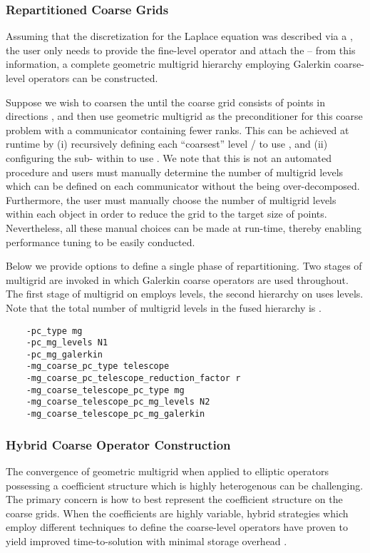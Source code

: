 \documentclass[]{siamart0216}
\begin{document}
\subsubsection{Repartitioned Coarse Grids}
	Assuming that the discretization for the Laplace equation was described via a , 
	the user only needs to provide the fine-level operator and attach the  -- 
	from this information, a complete geometric multigrid hierarchy employing Galerkin 
	coarse-level operators can be constructed. 
	
	Suppose we wish to coarsen the  until the coarse grid consists of 
	 points in directions , and then use geometric 
	multigrid as the preconditioner for this coarse problem with a communicator containing fewer ranks.
	This can be achieved at runtime by (i) recursively defining each ``coarsest'' 
	level / to use , and (ii) configuring the sub- within  to use .
	We note that this is not an automated procedure and users must manually 
	determine the number of multigrid levels which can be defined on each communicator
	without the  being over-decomposed. 
	Furthermore, the user must manually choose the number of multigrid levels within each 
	 object in order to reduce the grid to the target size of  points. Nevertheless,
    all these manual choices can be made at 
	run-time, thereby enabling performance tuning to be easily conducted.
	
	Below we provide options to define a single phase of repartitioning. Two stages of multigrid are invoked 
	in which Galerkin coarse operators are used throughout. The first stage of multigrid on  
	employs  levels, the second hierarchy on  uses  levels. 
	Note that the total number of multigrid levels in the fused hierarchy is .
\begin{tcolorbox}[colframe=red,colback=cornsilk,boxrule=0.5pt,arc=4pt,
      left=-6pt,right=6pt,top=6pt,bottom=6pt,boxsep=0pt]
	\begin{verbatim}
    -pc_type mg
    -pc_mg_levels N1
    -pc_mg_galerkin
    -mg_coarse_pc_type telescope
    -mg_coarse_pc_telescope_reduction_factor r
    -mg_coarse_telescope_pc_type mg
    -mg_coarse_telescope_pc_mg_levels N2
    -mg_coarse_telescope_pc_mg_galerkin
	\end{verbatim}
\end{tcolorbox}
\subsubsection{Hybrid Coarse Operator Construction}
The convergence of geometric multigrid when applied to elliptic operators possessing a 
	coefficient structure which is highly heterogenous can be challenging. 
	The primary concern is how to best represent the coefficient structure on the coarse grids. 
	When the coefficients are highly variable, hybrid strategies which employ different techniques 
	to define the coarse-level operators have proven to yield improved time-to-solution with 
	minimal storage overhead \cite{may2015scalable,sundar2012parallel}.
\end{document}
